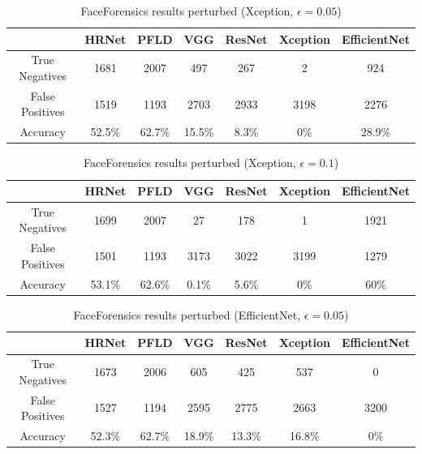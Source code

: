 \begin{table}[H]
    \centering
    \begin{tabular}{|c|c|c|c|c|c|c|}
        \hline
        \textbf{} & \textbf{HRNet} & \textbf{PFLD} &  \textbf{VGG} & \textbf{ResNet} & \textbf{Xception} & \textbf{EfficientNet} \\
        \hline
        True Negatives & 1681 & 2007 & 497 & 267 & 2 & 924\\
        \hline
        False Positives & 1519 & 1193 & 2703 & 2933 & 3198 & 2276\\
        \hline
        Accuracy & 52.5\% & 62.7\% & 15.5\% & 8.3\% & 0\% & 28.9\% \\
        \hline
    \end{tabular}
    \caption{FaceForensics results perturbed (Xception, $\epsilon=0.05$)}
    \label{tab:ff-xce-5}
\end{table}

\begin{table}[H]
    \centering
    \begin{tabular}{|c|c|c|c|c|c|c|}
        \hline
        \textbf{} & \textbf{HRNet} & \textbf{PFLD} &  \textbf{VGG} & \textbf{ResNet} & \textbf{Xception} & \textbf{EfficientNet} \\
        \hline
        True Negatives & 1699 & 2007 & 27 & 178 & 1 & 1921\\
        \hline
        False Positives & 1501 & 1193 & 3173 & 3022 & 3199 & 1279 \\
        \hline
        Accuracy & 53.1\% & 62.6\% & 0.1\% & 5.6\% & 0\% & 60\% \\
        \hline
    \end{tabular}
    \caption{FaceForensics results perturbed (Xception, $\epsilon=0.1$)}
    \label{tab:ff-xce-1}
\end{table}

\begin{table}[H]
    \centering
    \begin{tabular}{|c|c|c|c|c|c|c|}
        \hline
        \textbf{} & \textbf{HRNet} & \textbf{PFLD} &  \textbf{VGG} & \textbf{ResNet} & \textbf{Xception} & \textbf{EfficientNet} \\
        \hline
        True Negatives & 1673 & 2006 & 605 & 425 & 537 & 0\\
        \hline
        False Positives & 1527 & 1194 & 2595 & 2775 & 2663 & 3200\\
        \hline
        Accuracy & 52.3\% & 62.7\% & 18.9\% & 13.3\% & 16.8\% & 0\% \\
        \hline
    \end{tabular}
    \caption{FaceForensics results perturbed (EfficientNet, $\epsilon=0.05$)}
    \label{tab:ff-eff-5}
\end{table}


